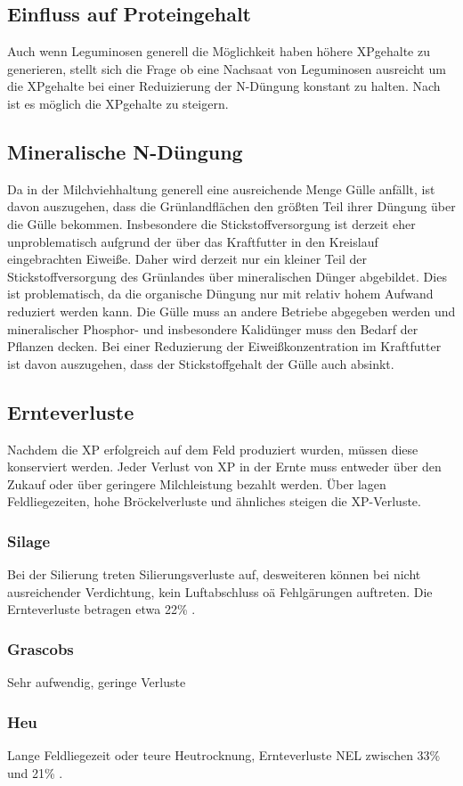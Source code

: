 \subsection{Einfluss auf Proteingehalt}
\label{subsec:Protein}

Auch wenn Leguminosen generell die Möglichkeit haben höhere \ac{XP}gehalte zu generieren, stellt sich die Frage ob eine Nachsaat von Leguminosen ausreicht um die \ac{XP}gehalte bei einer Reduizierung der N-Düngung konstant zu halten.
Nach \textcite[35]{weggler2050leguminosen} ist es möglich die \ac{XP}gehalte zu steigern.

\subsection{Mineralische N-Düngung}
\label{subsec:Lit:N-Düngung}

Da in der Milchviehhaltung generell eine ausreichende Menge Gülle anfällt, ist davon auszugehen, dass die Grünlandflächen den größten Teil ihrer Düngung über die Gülle bekommen.
Insbesondere die Stickstoffversorgung ist derzeit eher unproblematisch aufgrund der über das Kraftfutter in den Kreislauf eingebrachten Eiweiße.
Daher wird derzeit nur ein kleiner Teil der Stickstoffversorgung des Grünlandes über mineralischen Dünger abgebildet.
Dies ist problematisch, da die organische Düngung nur mit relativ hohem Aufwand reduziert werden kann.
Die Gülle muss an andere Betriebe abgegeben werden und mineralischer Phosphor- und insbesondere Kalidünger muss den Bedarf der Pflanzen decken.
Bei einer Reduzierung der Eiweißkonzentration im Kraftfutter ist davon auszugehen, dass der Stickstoffgehalt der Gülle auch absinkt.

\subsection{Ernteverluste}
\label{subsec:Lit:Ernte}

Nachdem die \ac{XP} erfolgreich auf dem Feld produziert wurden, müssen diese konserviert werden.
Jeder Verlust von \ac{XP} in der Ernte muss entweder über den Zukauf oder über geringere Milchleistung bezahlt werden.
Über lagen Feldliegezeiten, hohe Bröckelverluste und ähnliches steigen die \ac{XP}-Verluste.

\subsubsection{Silage}
\label{subsub:Silage}
Bei der Silierung treten Silierungsverluste auf, desweiteren können bei nicht ausreichender Verdichtung, kein Luftabschluss oä Fehlgärungen auftreten.
Die Ernteverluste betragen etwa 22\% \parencite[30]{fritz2018wirtschaftliche}.


\subsubsection{Grascobs}
\label{subsub:Peletts}
Sehr aufwendig, geringe Verluste \parencite[12f]{engel2013protein}

\subsubsection{Heu}
\label{subsub:Heu}
Lange Feldliegezeit oder teure Heutrocknung, Ernteverluste \ac{NEL} zwischen 33\% und 21\% \parencite[30]{fritz2018wirtschaftliche}.

